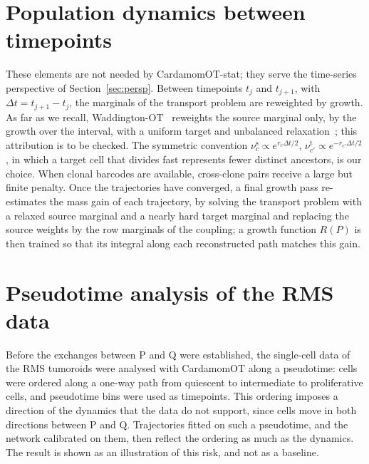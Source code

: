\documentclass[a4paper, 11pt]{article}
\newcommand{\cP}{\mathrm{P}}
\newcommand{\cQ}{\mathrm{Q}}
\theoremstyle{plain}
\theoremstyle{remark}
\begin{document}
\section{Population dynamics between timepoints}\label{sup:timeseries}

These elements are not needed by CardamomOT-stat; they serve the time-series perspective of Section~\ref{sec:persp}. Between timepoints $t_j$ and $t_{j+1}$, with $\Delta t = t_{j+1} - t_j$, the marginals of the transport problem are reweighted by growth. As far as we recall, Waddington-OT~\cite{schiebinger2019optimal} reweights the source marginal only, by the growth over the interval, with a uniform target and unbalanced relaxation~\cite{chizat2018scaling}; this attribution is to be checked. The symmetric convention $\nu^{\mathrm{s}}_c \propto e^{r_c\Delta t/2}$, $\nu^{\mathrm{t}}_{c'} \propto e^{-r_{c'}\Delta t/2}$, in which a target cell that divides fast represents fewer distinct ancestors, is our choice. When clonal barcodes are available, cross-clone pairs receive a large but finite penalty. Once the trajectories have converged, a final growth pass re-estimates the mass gain of each trajectory, by solving the transport problem with a relaxed source marginal and a nearly hard target marginal and replacing the source weights by the row marginals of the coupling; a growth function $R(P)$ is then trained so that its integral along each reconstructed path matches this gain.


\section{Pseudotime analysis of the RMS data}\label{sup:pseudotime}

Before the exchanges between $\cP$ and $\cQ$ were established, the single-cell data of the RMS tumoroids were analysed with CardamomOT along a pseudotime: cells were ordered along a one-way path from quiescent to intermediate to proliferative cells, and pseudotime bins were used as timepoints. This ordering imposes a direction of the dynamics that the data do not support, since cells move in both directions between $\cP$ and $\cQ$. Trajectories fitted on such a pseudotime, and the network calibrated on them, then reflect the ordering as much as the dynamics. The result is shown as an illustration of this risk, and not as a baseline.
\end{document}
